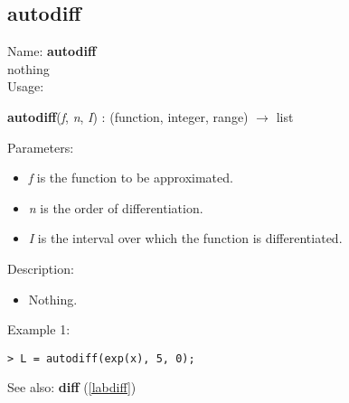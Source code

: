 \subsection{autodiff}
\label{labautodiff}
\noindent Name: \textbf{autodiff}\\
nothing\\
\noindent Usage: 
\begin{center}
\textbf{autodiff}(\emph{f}, \emph{n}, \emph{I}) : (\textsf{function}, \textsf{integer}, \textsf{range}) $\rightarrow$ \textsf{list}\\
\end{center}
Parameters: 
\begin{itemize}
\item \emph{f} is the function to be approximated.
\item \emph{n} is the order of differentiation.
\item \emph{I} is the interval over which the function is differentiated.
\end{itemize}
\noindent Description: \begin{itemize}

\item Nothing.
\end{itemize}
\noindent Example 1: 
\begin{center}\begin{minipage}{15cm}\begin{Verbatim}[frame=single]
> L = autodiff(exp(x), 5, 0);
\end{Verbatim}
\end{minipage}\end{center}
See also: \textbf{diff} (\ref{labdiff})
